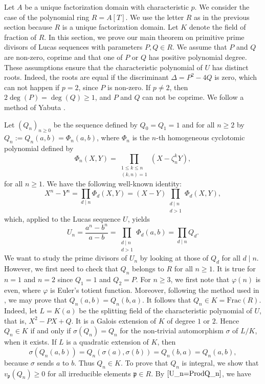 \documentclass[reqno]{amsart}
\begin{document}
Let $A$ be a unique factorization domain with characteristic $p$. We consider the case of the polynomial ring $R=A[T]$. We use the letter $R$ as in the previous section because $R$ is a unique factorization domain. Let $K$ denote the field of fraction of $R$. In this section, we prove our main theorem on primitive prime divisors of Lucas sequences with parameters $P,Q\in R$. We assume that $P$ and $Q$ are non-zero, coprime and that one of $P$ or $Q$ has positive polynomial degree. These assumptions ensure that the characteristic polynomial of $U$ has distinct roots. Indeed, the roots are equal if the discriminant $\Delta=P^2-4Q$ is zero, which can not happen if $p=2$, since $P$ is non-zero. If $p\ne 2$, then $2\deg(P) = \deg(Q) \geq 1$, and $P$ and $Q$ can not be coprime. We follow a method of Yabuta \cite{Ya}.

Let $(Q_n)_{n\geq 0}$ be the sequence defined by $Q_0=Q_1=1$ and for all $n\geq 2$ by $Q_n:=Q_n(a,b)=\Phi_n(a,b)$, where $\Phi_n$ is the $n$-th homogeneous cyclotomic polynomial defined by
\[
\Phi_n(X,Y) = \prod_{\substack{1\leq k\leq n \\ (k,n)=1}} (X-\zeta_n^kY),
\]
for all $n\geq 1$. We have the following well-known identity:
\[
X^n-Y^n = \prod_{d\mid n} \Phi_d(X,Y) = (X-Y) \prod_{\substack{d\mid n \\ d>1}} \Phi_d(X,Y),
\]
which, applied to the Lucas sequence $U$, yields
\begin{equation}\label{U_n=ProdQ_n}
    U_n = \frac{a^n-b^n}{a-b} = \prod_{\substack{d\mid n \\ d>1}} \Phi_d(a,b) =\prod_{d\mid n} Q_d.
\end{equation}
We want to study the prime divisors of $U_n$ by looking at those of $Q_d$ for all $d\mid n$. However, we first need to check that $Q_n$ belongs to $R$ for all $n\geq 1$. It is true for $n=1$ and $n=2$ since $Q_1=1$ and $Q_2=P$. For $n\geq 3$, we first note that $\varphi(n)$ is even, where $\varphi$ is Euler's totient function. Moreover, following the method used in \cite[p.\,89]{BaWi}, we may prove that $Q_n(a,b)=Q_n(b,a)$. It follows that $Q_n\in K=\mathrm{Frac}(R)$. Indeed, let $L=K(a)$ be the splitting field of the characteristic polynomial of $U$, that is, $X^2-PX+Q$. It is a Galois extension of $K$ of degree $1$ or $2$. Hence $Q_n\in K$ if and only if $\sigma(Q_n)=Q_n$ for the non-trivial automorphism $\sigma$ of $L/K$, when it exists. If $L$ is a quadratic extension of $K$, then 
\[
\sigma(Q_n(a,b))= Q_n(\sigma(a),\sigma(b))=Q_n(b,a) = Q_n(a,b),
\]
because $\sigma$ sends $a$ to $b$. Thus $Q_n\in K$. To prove that $Q_n$ is integral, we show that $v_\mathfrak{p}(Q_n)\geq 0$ for all irreducible elements $\mathfrak{p}\in R$. By $\eqref{U_n=ProdQ_n}$, we have
\end{document}
